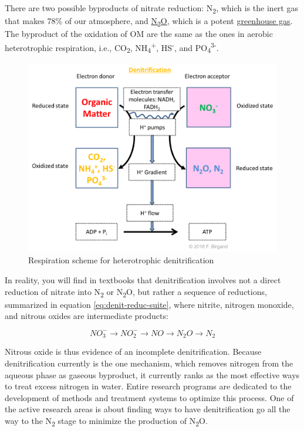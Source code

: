 \documentclass[]{book}
\theoremstyle{definition}
\theoremstyle{definition}
\theoremstyle{definition}
\theoremstyle{remark}
\begin{document}
There are two possible byproducts of nitrate reduction:
N\textsubscript{2}, which is the inert gas that makes 78\% of our
atmosphere, and \protect\hyperlink{nitrous-oxide}{N\textsubscript{2}O},
which is a potent \protect\hyperlink{GHG}{greenhouse gas}. The byproduct
of the oxidation of OM are the same as the ones in aerobic heterotrophic
respiration, i.e., CO\textsubscript{2},
NH\textsubscript{4}\textsuperscript{+}, HS\textsuperscript{-}, and
PO\textsubscript{4}\textsuperscript{3-}.

\begin{figure}

{\centering \includegraphics[width=0.75\linewidth]{pictures/respiration-OM-NO3} 

}

\caption{Respiration scheme for heterotrophic denitrification}\label{fig:denit-resp}
\end{figure}

In reality, you will find in textbooks that denitrification involves not
a direct reduction of nitrate into N\textsubscript{2} or
N\textsubscript{2}O, but rather a sequence of reductions, summarized in
equation \eqref{eq:denit-reduc-suite}, where nitrite, nitrogen monoxide,
and nitrous oxides are intermediate products:

\begin{equation}
NO_3^- \rightarrow NO_2^- \rightarrow NO \rightarrow N_2O \rightarrow N_2
\label{eq:denit-reduc-suite}
\end{equation}

Nitrous oxide is thus evidence of an incomplete denitrification. Because
denitrification currently is the one mechanism, which removes nitrogen
from the aqueous phase as gaseous byproduct, it currently ranks as the
most effective ways to treat excess nitrogen in water. Entire research
programs are dedicated to the development of methods and treatment
systems to optimize this process. One of the active research areas is
about finding ways to have denitrification go all the way to the
N\textsubscript{2} stage to minimize the production of
N\textsubscript{2}O.
\end{document}
